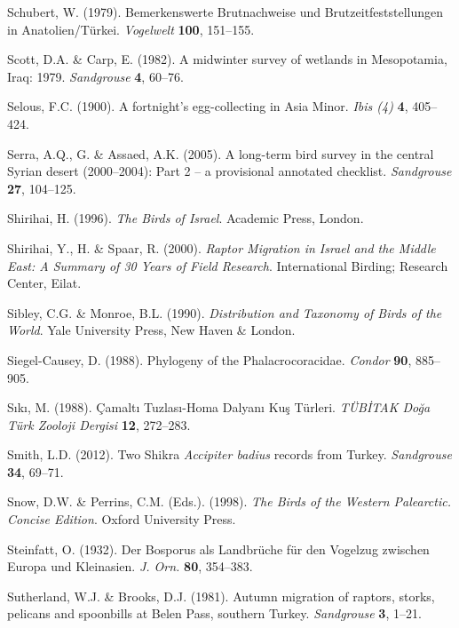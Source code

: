 \documentclass[
  a4paper,
  DIV=11,
  numbers=noendperiod]{scrreprt}
\newlength{\cslhangindent}
\newenvironment{CSLReferences}[2] %
 {\begin{list}{}{%
  \setlength{\itemindent}{0pt}
  \setlength{\leftmargin}{0pt}
  \setlength{\parsep}{0pt}
  \ifodd #1
   \setlength{\leftmargin}{\cslhangindent}
   \setlength{\itemindent}{-1\cslhangindent}
  \fi
  \setlength{\itemsep}{#2\baselineskip}}}
 {\end{list}}
\begin{document}
\begin{CSLReferences}{1}{1}
Schubert, W. (1979). {Bemerkenswerte Brutnachweise und
Brutzeitfeststellungen in Anatolien/Türkei}. \emph{Vogelwelt}
\textbf{100}, 151--155.

Scott, D.A. \& Carp, E. (1982). {A midwinter survey of wetlands in
Mesopotamia, Iraq: 1979}. \emph{Sandgrouse} \textbf{4}, 60--76.

Selous, F.C. (1900). {A fortnight's egg-collecting in Asia Minor}.
\emph{Ibis (4)} \textbf{4}, 405--424.

Serra, A.Q., G. \& Assaed, A.K. (2005). {A long-term bird survey in the
central Syrian desert (2000--2004): Part 2 -- a provisional annotated
checklist}. \emph{Sandgrouse} \textbf{27}, 104--125.

Shirihai, H. (1996). \emph{{The Birds of Israel}}. Academic Press,
London.

Shirihai, Y., H. \& Spaar, R. (2000). \emph{{Raptor Migration in Israel
and the Middle East: A Summary of 30 Years of Field Research}}.
International Birding; Research Center, Eilat.

Sibley, C.G. \& Monroe, B.L. (1990). \emph{{Distribution and Taxonomy of
Birds of the World}}. Yale University Press, New Haven \& London.

Siegel-Causey, D. (1988). {Phylogeny of the Phalacrocoracidae}.
\emph{Condor} \textbf{90}, 885--905.

Sıkı, M. (1988). {Çamaltı Tuzlası-Homa Dalyanı Kuş Türleri}.
\emph{TÜBİTAK Doğa Türk Zooloji Dergisi} \textbf{12}, 272--283.

Smith, L.D. (2012). {Two Shikra \emph{Accipiter badius} records from
Turkey}. \emph{Sandgrouse} \textbf{34}, 69--71.

Snow, D.W. \& Perrins, C.M. (Eds.). (1998). \emph{{The Birds of the
Western Palearctic. Concise Edition}}. Oxford University Press.

Steinfatt, O. (1932). {Der Bosporus als Landbrüche für den Vogelzug
zwischen Europa und Kleinasien}. \emph{J. Orn.} \textbf{80}, 354--383.

Sutherland, W.J. \& Brooks, D.J. (1981). {Autumn migration of raptors,
storks, pelicans and spoonbills at Belen Pass, southern Turkey}.
\emph{Sandgrouse} \textbf{3}, 1--21.


\end{CSLReferences}
\end{document}
